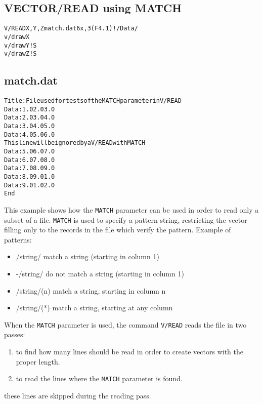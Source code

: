 \clearpage

\subsection{VECTOR/READ using MATCH}
\begin{alltt}
     V/READ X,Y,Z match.dat 6x,3(F4.1) ! /Data/
      v/draw X
      v/draw Y ! S
      v/draw Z ! S
\end{alltt} 
\subsection*{match.dat}
\begin{alltt}
     Title: File used for tests of the MATCH parameter in V/READ
      Data : 1.0 2.0 3.0
      Data : 2.0 3.0 4.0
      Data : 3.0 4.0 5.0
      Data : 4.0 5.0 6.0
     This line will be ignored by a V/READ with MATCH
      Data : 5.0 6.0 7.0
      Data : 6.0 7.0 8.0
      Data : 7.0 8.0 9.0
      Data : 8.0 9.0 1.0
      Data : 9.0 1.0 2.0
     End
\end{alltt} 
This example shows how the {\tt MATCH} parameter can be used in order to
read only a subset of a file. {\tt MATCH} is used to specify a pattern 
string, restricting the vector filling only to the records in the file 
which verify the pattern. Example of patterns: 
\begin{itemize}
\item     /string/      match a string (starting in column 1)
\item    -/string/      do not match a string (starting in column 1)
\item     /string/(n)   match a string, starting in column n
\item     /string/(*)   match a string, starting at any column
\end{itemize}
\begin{DinglistE}
\item When the {\tt MATCH} parameter is used, the command {\tt V/READ} reads
      the file in two passes:
\begin{enumerate}
\item to find how many lines should be read in order to create vectors with
      the proper length.
\item to read the lines where the {\tt MATCH} parameter is found.
\end{enumerate}
\item these lines are skipped during the reading pass.
\end{DinglistE}

